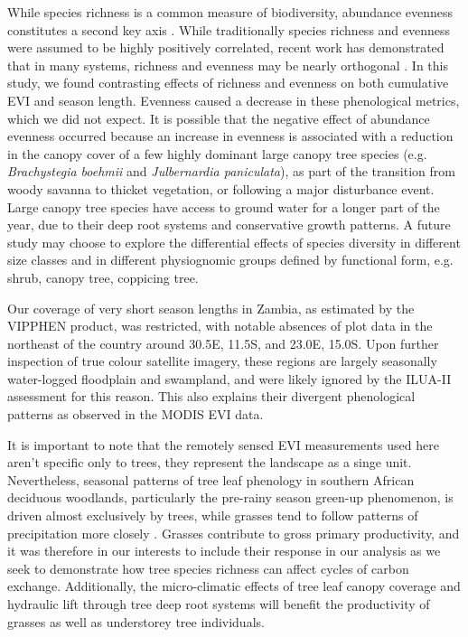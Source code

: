 \documentclass[11pt,a4paper]{article}
\begin{document}
While species richness is a common measure of biodiversity, abundance evenness constitutes a second key axis \citep{Wilsey2005, Hillebrand2008}. While traditionally species richness and evenness were assumed to be highly positively correlated, recent work has demonstrated that in many systems, richness and evenness may be nearly orthogonal \citep{}. In this study, we found contrasting effects of richness and evenness on both cumulative EVI and season length. Evenness caused a decrease in these phenological metrics, which we did not expect. It is possible that the negative effect of abundance evenness occurred because an increase in evenness is associated with a reduction in the canopy cover of a few highly dominant large canopy tree species (e.g. \textit{Brachystegia boehmii} and \textit{Julbernardia paniculata}), as part of the transition from woody savanna to thicket vegetation, or following a major disturbance event. Large canopy tree species have access to ground water for a longer part of the year, due to their deep root systems and conservative growth patterns. A future study may choose to explore the differential effects of species diversity in different size classes and in different physiognomic groups defined by functional form, e.g. shrub, canopy tree, coppicing tree.

Our coverage of very short season lengths in Zambia, as estimated by the VIPPHEN product, was restricted, with notable absences of plot data in the northeast of the country around 30.5\textdegree{}E, 11.5\textdegree{}S, and 23.0\textdegree{}E, 15.0\textdegree{}S. Upon further inspection of true colour satellite imagery, these regions are largely seasonally water-logged floodplain and swampland, and were likely ignored by the ILUA-II assessment for this reason. This also explains their divergent phenological patterns as observed in the MODIS EVI data. 

It is important to note that the remotely sensed EVI measurements used here aren't specific only to trees, they represent the landscape as a singe unit. Nevertheless, seasonal patterns of tree leaf phenology in southern African deciduous woodlands, particularly the pre-rainy season green-up phenomenon, is driven almost exclusively by trees, while grasses tend to follow patterns of precipitation more closely \citep{}. Grasses contribute to gross primary productivity, and it was therefore in our interests to include their response in our analysis as we seek to demonstrate how tree species richness can affect cycles of carbon exchange. Additionally, the micro-climatic effects of tree leaf canopy coverage and hydraulic lift through tree deep root systems will benefit the productivity of grasses as well as understorey tree individuals.
\end{document}
